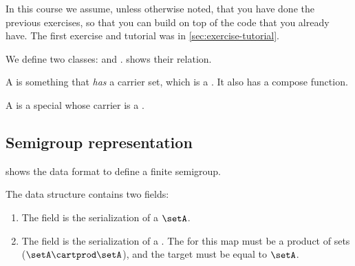 
\begin{remark}
    In this course we assume, unless otherwise noted, that you have done the previous exercises, so that you can build on top of the code that you already have.
    The first exercise and tutorial was in \cref{sec:exercise-tutorial}.
\end{remark}

\begin{figure*}[b]
    \caption{}
    \label{fig:uml_semigroup}
\end{figure*}

We define two classes: \Semigroup and \FiniteSemigroup.
 shows their relation.

A \Semigroup is something that \emph{has} a carrier set, which is a \Setoid.
It also has a compose function.


A \FiniteSemigroup is a special \Semigroup whose carrier is a \FiniteSet.


\vfill\clearpage

\subsection{Semigroup representation}

\begin{marginfigure}%
    \caption{}%
    \label{fig:sm_min3}%
\end{marginfigure}%

 shows the data format to define a finite semigroup.

The data structure contains two fields:
\begin{enumerate}
    \item The field  is the serialization of a \FiniteSet $\setA$.
    \item The field  is the serialization of a \FiniteMap.
          The  for this map must be a product of sets ($\setA \cartprod \setA$), and the target must be equal to $\setA$.
\end{enumerate}


